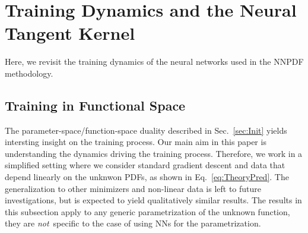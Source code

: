 \section{Training Dynamics and the Neural Tangent Kernel}
\label{sec:NTKPheno}

Here, we revisit the training dynamics of the neural networks used in the NNPDF
methodology.

\subsection{Training in Functional Space}
The parameter-space/function-space duality described in Sec.~\ref{sec:Init}
yields intersting insight on the training process. Our main aim in this paper is
understanding the dynamics driving the training process. Therefore, we work in a
simplified setting where we consider standard gradient descent and data that
depend linearly on the unknwon PDFs, as shown in Eq.~\eqref{eq:TheoryPred}. The
generalization to other minimizers and non-linear data is left to future
investigations, but is expected to yield qualitatively similar results. The
results in this subsection apply to any generic parametrization of the unknown
function, they are {\em not}\ specific to the case of using NNs for the
parametrization.

